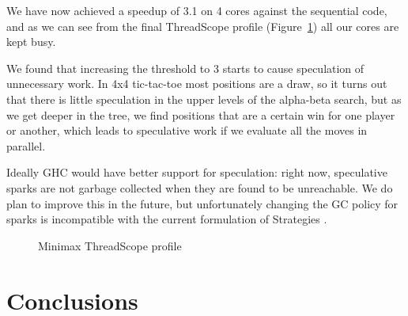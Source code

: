 \documentclass[twocolumn,9pt]{sigplanconf}
\begin{document}
We have now achieved a speedup of 3.1 on 4 cores against the
sequential code, and as we can see from the final ThreadScope profile
(Figure~\ref{f:minimax-threadscope3}) all our cores are kept busy.

We found that increasing the threshold to 3 starts to cause
speculation of unnecessary work.  In 4x4 tic-tac-toe most positions
are a draw, so it turns out that there is little speculation in the
upper levels of the alpha-beta search, but as we get deeper in the
tree, we find positions that are a certain win for one player or
another, which leads to speculative work if we evaluate all the moves
in parallel.  

Ideally GHC would have better support for speculation: right now,
speculative sparks are not garbage collected when they are found to be
unreachable.  We do plan to improve this in the future, but
unfortunately changing the GC policy for sparks is incompatible with
the current formulation of Strategies \cite{multicore-ghc}.

\begin{figure}
\caption{Minimax ThreadScope profile}
\label{f:minimax-threadscope3}
\end{figure}



\section{Conclusions}



\end{document}
